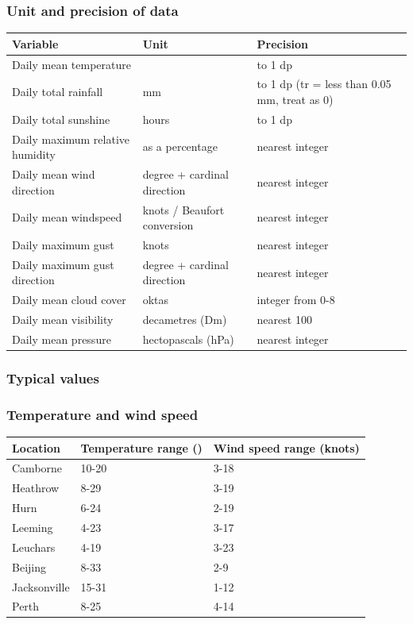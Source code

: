 \documentclass[fleqn, 11pt]{article}
\begin{document}
	\subsubsection{Unit and precision of data}
	\begin{tabular}{|l|l|l|}
		\hline
		\textbf{Variable} & \textbf{Unit} & \textbf{Precision}\\
		\hline
		Daily mean temperature & \textcelsius & to 1 dp\\
		\hline
		Daily total rainfall & mm & to 1 dp (tr = less than 0.05 mm, treat as 0)\\
		\hline
		Daily total sunshine & hours & to 1 dp \\
		\hline
		Daily maximum relative humidity & as a percentage & nearest integer \\
		\hline
		Daily mean wind direction & degree + cardinal direction & nearest integer  \\
		\hline
		Daily mean windspeed & knots / Beaufort conversion & nearest integer \\
		\hline
		Daily maximum gust & knots & nearest integer   \\
		\hline
		Daily maximum gust direction & degree + cardinal direction & nearest integer   \\
		\hline
		Daily mean cloud cover & oktas  & integer from 0-8   \\
		\hline
		Daily mean visibility & decametres (Dm) & nearest 100  \\
		\hline
		Daily mean pressure & hectopascals (hPa) & nearest integer  \\
		\hline
	\end{tabular}
	
	\subsubsection{Typical values}
	\subsubsection*{Temperature and wind speed}
	\begin{tabular}{|l|l|l|}
		\hline
		\textbf{Location} & \textbf{Temperature range (\textcelsius)}& \textbf{Wind speed range (knots)} \\
		\hline
		Camborne & 10-20 & 3-18 \\
		\hline
		Heathrow & 8-29 & 3-19 \\
		\hline
		Hurn & 6-24 & 2-19 \\
		\hline
		Leeming & 4-23 & 3-17 \\
		\hline
		Leuchars & 4-19 & 3-23 \\
		\hline
		Beijing & 8-33 & 2-9 \\
		\hline
		Jacksonville & 15-31 & 1-12 \\
		\hline
		Perth & 8-25 & 4-14 \\
		\hline
	\end{tabular}
	
\end{document}
